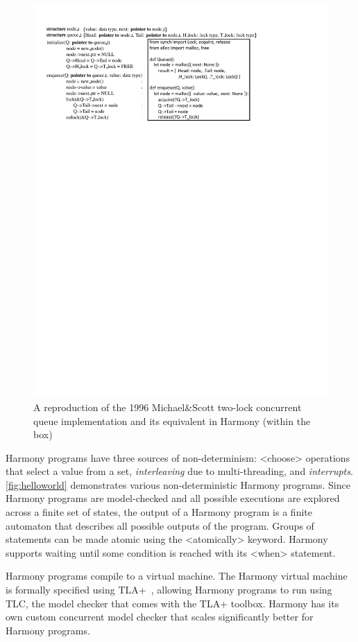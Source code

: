 \documentclass[twocolumn]{article}
\begin{document}
\begin{figure}
\begin{center}
\includegraphics[width=.9\textwidth]{MS.pdf}
\end{center}
\caption{A reproduction of the 1996 Michael\&Scott two-lock concurrent queue
implementation and its equivalent in Harmony (within the box)}
\label{fig:ms}
\end{figure}

Harmony programs have three sources of non-determinism:
<{choose}> operations that select a value from a set,
\emph{interleaving} due to multi-threading, and \emph{interrupts}.
\autoref{fig:helloworld} demonstrates various non-deterministic
Harmony programs.
Since Harmony programs are model-checked and all possible
executions are explored across a finite set of states, the output of a
Harmony program is a finite automaton that describes all possible
outputs of the program.  Groups of statements can be made atomic
using the <{atomically}> keyword.  Harmony supports
waiting until some condition is reached with its <{when}> statement.

Harmony programs compile to a virtual machine.  The Harmony virtual
machine is formally specified using TLA+~\cite{Lamport02}, allowing
Harmony programs to run using TLC, the model checker that comes
with the TLA+ toolbox.  Harmony has its own custom concurrent model
checker that scales significantly better for Harmony programs.
\end{document}

